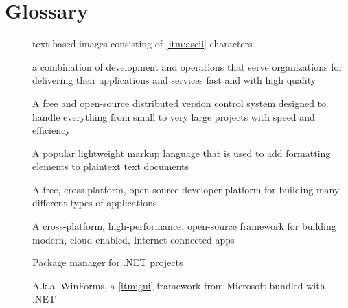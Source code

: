 \chapter*{Glossary}

\begin{description}
    \item [] text-based images consisting of \ref{itm:ascii} characters \cite{randal_ascii_2015}
    \item [] a combination of development and operations that serve organizations for delivering their applications and services fast and with high quality \cite{amazon_web_services_inc_what_nodate}
    \item [] A free and open-source distributed version control system designed to handle everything from small to very large projects with speed and efficiency \cite{git_git_2022}
    \item [] A popular lightweight markup language that is used to add formatting elements to plaintext text documents \cite{cone_getting_2022}
    \item [] A free, cross-platform, open-source developer platform for building many different types of applications \cite{microsoft_what_2022}
    \item [] A cross-platform, high-performance, open-source framework for building modern, cloud-enabled, Internet-connected apps \cite{anderson_overview_2022}
    \item [] Package manager for .NET projects \cite{microsoft_nuget_2022}
    \item [] A.k.a. WinForms, a \ref{itm:gui} framework from Microsoft bundled with .NET \cite{george_what_2022}
\end{description}